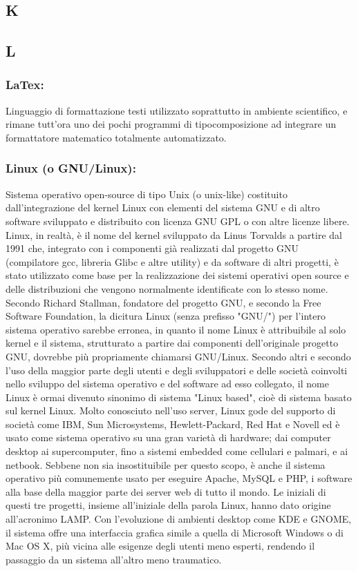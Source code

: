 \subsection*{\huge{K}}
\subsection*{\huge{L}}
\subsubsection*{LaTex:} Linguaggio di formattazione testi utilizzato
soprattutto in ambiente scientifico, e rimane tutt'ora uno dei pochi programmi
di tipocomposizione ad integrare un formattatore matematico totalmente automatizzato.

\subsubsection{Linux (o GNU/Linux):} Sistema operativo open-source di
tipo Unix (o unix-like) costituito dall'integrazione del kernel Linux con
elementi del sistema GNU e di altro software sviluppato e distribuito con
licenza GNU GPL o con altre licenze libere. Linux, in realt\`a, \`e il nome del
kernel sviluppato da Linus Torvalds a partire dal 1991 che, integrato con i
componenti gi\`a realizzati dal progetto GNU (compilatore gcc, libreria Glibc e
altre utility) e da software di altri progetti, \`e stato utilizzato come base per
la realizzazione dei sistemi operativi open source e delle distribuzioni che
vengono normalmente identificate con lo stesso nome. Secondo Richard Stallman,
fondatore del progetto GNU, e secondo la Free Software Foundation, la dicitura
Linux (senza prefisso "GNU/") per l'intero sistema operativo sarebbe erronea, in
quanto il nome Linux \`e attribuibile al solo kernel e il sistema, strutturato a
partire dai componenti dell'originale progetto GNU, dovrebbe pi\`u propriamente
chiamarsi GNU/Linux. Secondo altri e secondo l'uso della maggior parte degli
utenti e degli sviluppatori e delle societ\`a coinvolti nello sviluppo del sistema
operativo e del software ad esso collegato, il nome Linux \`e ormai divenuto
sinonimo di sistema "Linux based", cio\`e di sistema basato sul kernel Linux.
Molto conosciuto nell'uso server, Linux gode del supporto di societ\`a come IBM,
Sun Microsystems, Hewlett-Packard, Red Hat e Novell ed \`e usato come sistema
operativo su una gran variet\`a di hardware; dai computer desktop ai
supercomputer, fino a sistemi embedded come cellulari e palmari, e ai netbook.
Sebbene non sia insostituibile per questo scopo, \`e anche il sistema operativo
pi\`u comunemente usato per eseguire Apache, MySQL e PHP, i software alla base
della maggior parte dei server web di tutto il mondo. Le iniziali di questi tre
progetti, insieme all'iniziale della parola Linux, hanno dato origine
all'acronimo LAMP. Con l'evoluzione di ambienti desktop come KDE e GNOME, il
sistema offre una interfaccia grafica simile a quella di Microsoft Windows o di
Mac OS X, pi\`u vicina alle esigenze degli utenti meno esperti, rendendo il
passaggio da un sistema all'altro meno traumatico.

